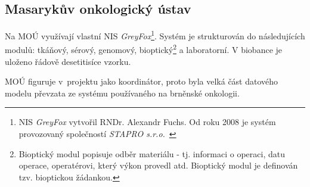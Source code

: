 \subsection{Masarykův onkologický ústav}
Na MOÚ využívají vlastní NIS \textit{GreyFox}\footnote{NIS \textit{GreyFox} vytvořil RNDr. Alexandr Fuchs. Od roku 2008 je systém provozovaný společností \textit{STAPRO s.r.o.}~\cite{GreyFox}}. Systém je strukturován do následujících modulů: tkáňový, sérový, genomový, bioptický\footnote{Bioptický modul popisuje odběr materiálu - tj. informaci o operaci, datu operace, operatérovi, který výkon provedl atd. Bioptický modul je definován tzv. bioptickou žádankou.} a laboratorní. V biobance je uloženo řádově desetitisíce vzorku.

MOÚ figuruje v~projektu jako koordinátor, proto byla velká část datového modelu převzata ze systému používaného na brněnské onkologii.

